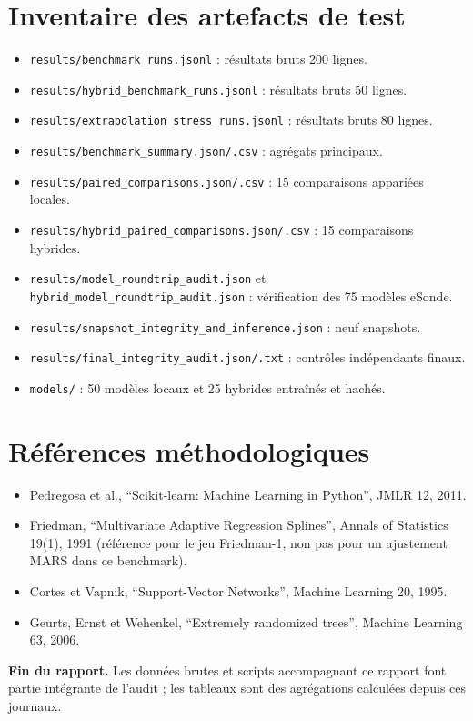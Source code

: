 \documentclass[11pt,a4paper]{article}
\begin{document}
\section{Inventaire des artefacts de test}
\begin{itemize}
\item \texttt{results/benchmark\_runs.jsonl} : résultats bruts 200 lignes.
\item \texttt{results/hybrid\_benchmark\_runs.jsonl} : résultats bruts 50 lignes.
\item \texttt{results/extrapolation\_stress\_runs.jsonl} : résultats bruts 80 lignes.
\item \texttt{results/benchmark\_summary.json/.csv} : agrégats principaux.
\item \texttt{results/paired\_comparisons.json/.csv} : 15 comparaisons appariées locales.
\item \texttt{results/hybrid\_paired\_comparisons.json/.csv} : 15 comparaisons hybrides.
\item \texttt{results/model\_roundtrip\_audit.json} et \texttt{hybrid\_model\_roundtrip\_audit.json} : vérification des 75 modèles eSonde.
\item \texttt{results/snapshot\_integrity\_and\_inference.json} : neuf snapshots.
\item \texttt{results/final\_integrity\_audit.json/.txt} : contrôles indépendants finaux.
\item \texttt{models/} : 50 modèles locaux et 25 hybrides entraînés et hachés.
\end{itemize}

\section{Références méthodologiques}
\begin{itemize}
\item Pedregosa et al., ``Scikit-learn: Machine Learning in Python'', JMLR 12, 2011.
\item Friedman, ``Multivariate Adaptive Regression Splines'', Annals of Statistics 19(1), 1991 (référence pour le jeu Friedman-1, non pas pour un ajustement MARS dans ce benchmark).
\item Cortes et Vapnik, ``Support-Vector Networks'', Machine Learning 20, 1995.
\item Geurts, Ernst et Wehenkel, ``Extremely randomized trees'', Machine Learning 63, 2006.
\end{itemize}

\vfill\small\textbf{Fin du rapport.} Les données brutes et scripts accompagnant ce rapport font partie intégrante de l'audit ; les tableaux sont des agrégations calculées depuis ces journaux.\
\end{document}
